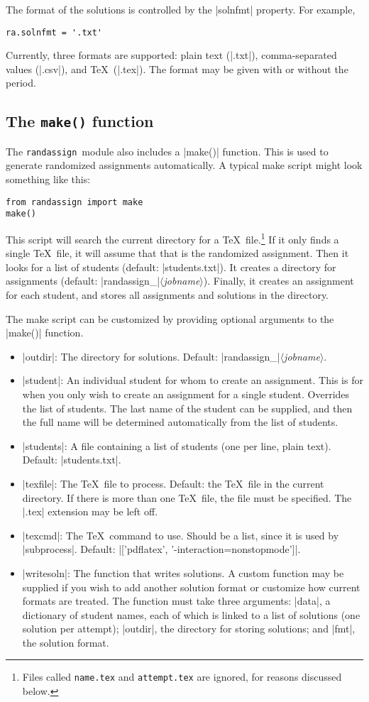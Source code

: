 \documentclass[11pt]{article}
\newcommand{\ra}{\texttt{randassign}}
\begin{document}
The format of the solutions is controlled by the |solnfmt| property.  For example,
\begin{Verbatim}
ra.solnfmt = '.txt'
\end{Verbatim}
Currently, three formats are supported:  plain text (|.txt|), comma-separated values (|.csv|), and \TeX\ (|.tex|).  The format may be given with or without the period.


\subsection{The \texttt{make()} function}

The \ra\ module also includes a |make()| function.  This is used to generate randomized assignments automatically.  A typical make script might look something like this:
\begin{Verbatim}
from randassign import make
make()
\end{Verbatim}
This script will search the current directory for a \TeX\ file.\footnote{Files called \texttt{name.tex} and \texttt{attempt.tex} are ignored, for reasons discussed below.}  If it only finds a single \TeX\ file, it will assume that that is the randomized assignment.  Then it looks for a list of students (default:  |students.txt|).  It creates a directory for assignments (default: |randassign_|$\langle$\textit{jobname}$\rangle$).  Finally, it creates an assignment for each student, and stores all assignments and solutions in the directory.

The make script can be customized by providing optional arguments to the |make()| function.
\begin{itemize}
\item |outdir|:  The directory for solutions.  Default:  |randassign_|$\langle$\textit{jobname}$\rangle$.
\item |student|:  An individual student for whom to create an assignment.  This is for when you only wish to create an assignment for a single student.  Overrides the list of students.  The last name of the student can be supplied, and then the full name will be determined automatically from the list of students.
\item |students|:  A file containing a list of students (one per line, plain text).  Default:  |students.txt|.
\item |texfile|:  The \TeX\ file to process.  Default:  the \TeX\ file in the current directory.  If there is more than one \TeX\ file, the file must be specified.  The |.tex| extension may be left off.
\item |texcmd|:  The \TeX\ command to use.  Should be a list, since it is used by |subprocess|.  Default:  |['pdflatex', '-interaction=nonstopmode']|.
\item |writesoln|:  The function that writes solutions.  A custom function may be supplied if you wish to add another solution format or customize how current formats are treated.  The function must take three arguments:  |data|, a dictionary of student names, each of which is linked to a list of solutions (one solution per attempt); |outdir|, the directory for storing solutions; and |fmt|, the solution format.
\end{itemize}
\end{document}
